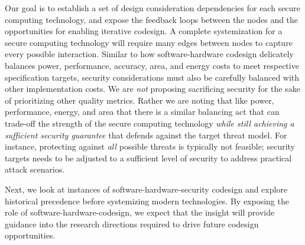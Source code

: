 Our goal is to establish a set of design consideration dependencies for each secure computing technology, and expose the feedback loops between the nodes and the opportunities for enabling iterative codesign.
A complete systemization for a secure computing technology will require many edges between nodes to capture every possible interaction.
Similar to how software-hardware codesign delicately balances power, performance, accuracy, area, and energy  costs to meet respective specification targets, security considerations must also be carefully balanced with other implementation costs.
We are \textit{not} proposing sacrificing security for the sake of prioritizing other quality metrics.
Rather we are noting that like power, performance, energy, and area that there is a similar balancing act that can trade-off the strength of the secure computing technology \textit{while still achieving a sufficient security guarantee} that defends against the target threat model.
For instance, protecting against \textit{all} possible threats is typically not feasible; security targets needs to be adjusted to a sufficient level of security to address practical attack scenarios.

Next, we look at instances of software-hardware-security codesign and explore historical precedence before systemizing modern technologies.
By exposing the role of software-hardware-codesign, we expect that the insight will provide guidance into the research directions required to drive future codesign opportunities.
